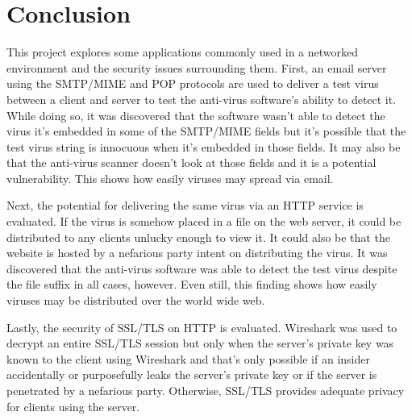 \documentclass[10pt,conference]{IEEEtran}
\begin{document}
\section{Conclusion}
This project explores some applications commonly used in a networked environment and the security issues
surrounding them. First, an email server using the SMTP/MIME and POP protocols are used to deliver a test virus between
a client and server to test the anti-virus software's ability to detect it. While doing so, it was discovered that the software
wasn't able to detect the virus it's embedded in some of the SMTP/MIME fields but it's possible that the test virus string 
is innocuous when it's embedded in those fields. It may also be that the anti-virus scanner doesn't look at those fields
and it is a potential vulnerability. This shows how easily viruses may spread via email.

Next, the potential for delivering the same virus via an HTTP service is evaluated. If the virus is somehow
placed in a file on the web server, it could be distributed to any clients unlucky enough to view it. It could also be that the
website is hosted by a nefarious party intent on distributing the virus. It was discovered that the anti-virus software was
able to detect the test virus despite the file suffix in all cases, however. Even still, this finding shows how easily viruses
may be distributed over the world wide web.  

Lastly, the security of SSL/TLS on HTTP is evaluated. Wireshark was used to decrypt an entire SSL/TLS session but only
when the server's private key was known to the client using Wireshark and that's only possible if an insider accidentally
or purposefully leaks the server's private key or if the server is penetrated by a nefarious party. Otherwise, SSL/TLS provides adequate privacy
for clients using the server.  










\end{document}
